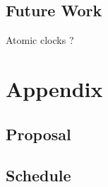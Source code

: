 \documentclass[a4paper,10pt,titlepage]{report}
\begin{document}
\section{Future Work}
 Atomic clocks ?    




\newpage
\chapter{Appendix}

\pagestyle{empty}
\printbibliography

\section{Proposal}


\section{Schedule}

\end{document}
